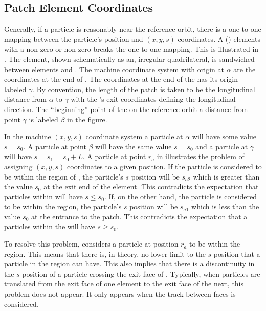 \subsection{Patch Element Coordinates}
\label{s:patch.prob}

Generally, if a particle is reasonably near the reference orbit, there is a one-to-one mapping
between the particle's position and $(x, y, s)$ coordinates. A  () elements
with a non-zero  or non-zero  breaks the one-to-one mapping. This is
illustrated in .  The  element, shown schematically as an, irregular
quadrilateral, is sandwiched between elements  and . The machine coordinate system
with origin at $\alpha$ are the coordinates at the end of . The coordinates at the end of
the  has its origin labeled $\gamma$. By convention, the length of the patch  is
taken to be the longitudinal distance from $\alpha$ to $\gamma$ with the 's exit
coordinates defining the longitudinal direction. The ``beginning'' point of the  on the
reference orbit a distance  from point $\gamma$ is labeled $\beta$ in the figure.

In the machine $(x, y, s)$ coordinate system a particle at $\alpha$ will have some value $s = s_0$. A
particle at point $\beta$ will have the same value $s = s_0$ and a particle at $\gamma$ will have $s
= s_1 = s_0 + L$. A particle at point $r_a$ in  illustrates the problem of
assigning $(x, y, s)$ coordinates to a given position. If the particle is considered to be within
the region of , the particle's $s$ position will be $s_{a2}$ which is greater than the
value $s_0$ at the exit end of the element. This contradicts the expectation that particles within
 will have $s \le s_0$.  If, on the other hand, the particle is considered to be within
the  region, the particle's $s$ position will be $s_{a1}$ which is less than the value
$s_0$ at the entrance to the patch. This contradicts the expectation that a particles within the
 will have $s \ge s_0$.

To resolve this problem, \accellat considers a particle at position $r_a$ to be within the 
region. This means that there is, in theory, no lower limit to the $s$-position that a particle in
the  region can have. This also implies that there is a discontinuity in the $s$-position
of a particle crossing the exit face of . Typically, when particles are translated from the
exit face of one element to the exit face of the next, this  problem does not appear. It
only appears when the track between faces is considered.

